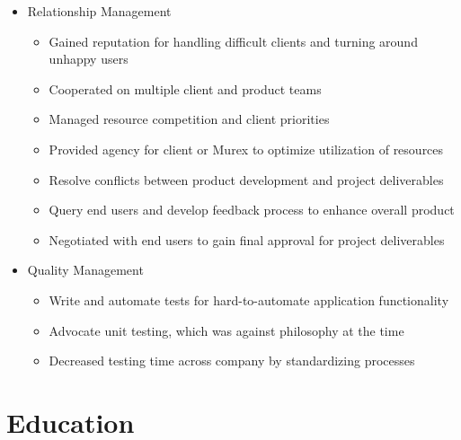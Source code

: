 \documentclass[11pt,letterpaper,roman]{moderncv}
\begin{document}
\begin{itemize}
    \item{Relationship Management}
    \begin{itemize}
        \item Gained reputation for handling difficult clients and turning around unhappy users
        \item Cooperated on multiple client and product teams
        \item Managed resource competition and client priorities
        \item Provided agency for client or Murex to optimize utilization of resources
        \item Resolve conflicts between product development and project deliverables
        \item Query end users and develop feedback process to enhance overall product
        \item Negotiated with end users to gain final approval for project deliverables
    \end{itemize}

    \item{Quality Management}
    \begin{itemize}
        \item Write and automate tests for hard-to-automate application functionality
        \item Advocate unit testing, which was against philosophy at the time
        \item Decreased testing time across company by standardizing processes\newline{}
    \end{itemize}
\end{itemize}



\section{Education}
\end{document}
